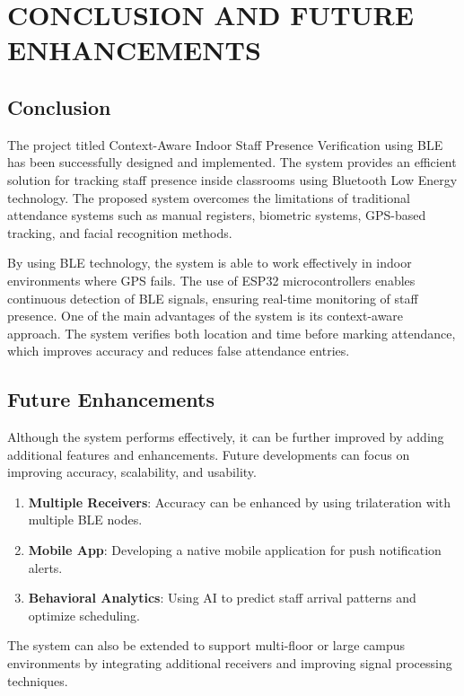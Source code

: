 \chapter{CONCLUSION AND FUTURE ENHANCEMENTS}

\section{Conclusion}
The project titled Context-Aware Indoor Staff Presence Verification using BLE has been successfully designed and implemented. The system provides an efficient solution for tracking staff presence inside classrooms using Bluetooth Low Energy technology. The proposed system overcomes the limitations of traditional attendance systems such as manual registers, biometric systems, GPS-based tracking, and facial recognition methods. 

By using BLE technology, the system is able to work effectively in indoor environments where GPS fails. The use of ESP32 microcontrollers enables continuous detection of BLE signals, ensuring real-time monitoring of staff presence. One of the main advantages of the system is its context-aware approach. The system verifies both location and time before marking attendance, which improves accuracy and reduces false attendance entries. 

\section{Future Enhancements}
Although the system performs effectively, it can be further improved by adding additional features and enhancements. Future developments can focus on improving accuracy, scalability, and usability.
\begin{enumerate}
    \item \textbf{Multiple Receivers}: Accuracy can be enhanced by using trilateration with multiple BLE nodes. 
    \item \textbf{Mobile App}: Developing a native mobile application for push notification alerts. 
    \item \textbf{Behavioral Analytics}: Using AI to predict staff arrival patterns and optimize scheduling. 
\end{enumerate}
The system can also be extended to support multi-floor or large campus environments by integrating additional receivers and improving signal processing techniques.
